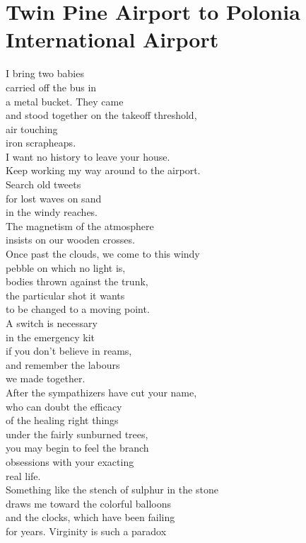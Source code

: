 \documentclass[smalldemyvopaper,11pt,twoside,onecolumn,openright,extrafontsizes]{memoir}
\begin{document}
\chapter{Twin Pine Airport to Polonia International Airport}
I bring two babies
\\carried off the bus in
\\a metal bucket. They came
\\and stood together on the takeoff threshold,
\\air touching
\\iron scrapheaps.
\\I want no history to leave your house.
\\Keep working my way around to the airport.
\\Search old tweets
\\for lost waves on sand
\\in the windy reaches.
\\The magnetism of the atmosphere
\\insists on our wooden crosses.
\\Once past the clouds, we come to this windy
\\pebble on which no light is,
\\bodies thrown against the trunk,
\\the particular shot it wants
\\to be changed to a moving point.
\\A switch is necessary
\\in the emergency kit
\\if you don't believe in reams,
\\and remember the labours
\\we made together.
\\After the sympathizers have cut your name,
\\who can doubt the efficacy
\\of the healing right things
\\under the fairly sunburned trees,
\\you may begin to feel the branch
\\obsessions with your exacting
\\real life.
\\Something like the stench of sulphur in the stone
\\draws me toward the colorful balloons
\\and the clocks, which have been failing
\\for years. Virginity is such a paradox
\end{document}
